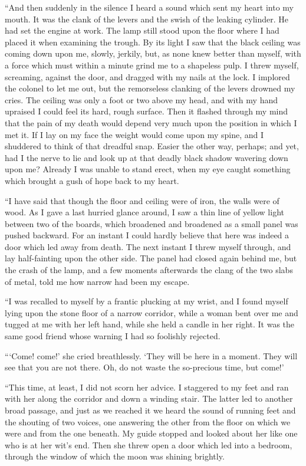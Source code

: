 \documentclass{article}
\begin{document}
``And then suddenly in the silence I heard a sound which sent my heart
into my mouth. It was the clank of the levers and the swish of the leaking
cylinder. He had set the engine at work. The lamp still stood upon the
floor where I had placed it when examining the trough. By its light I
saw that the black ceiling was coming down upon me, slowly, jerkily, but,
as none knew better than myself, with a force which must within a minute
grind me to a shapeless pulp. I threw myself, screaming, against the door,
and dragged with my nails at the lock. I implored the colonel to let me
out, but the remorseless clanking of the levers drowned my cries. The
ceiling was only a foot or two above my head, and with my hand upraised
I could feel its hard, rough surface. Then it flashed through my mind
that the pain of my death would depend very much upon the position in
which I met it. If I lay on my face the weight would come upon my spine,
and I shuddered to think of that dreadful snap. Easier the other way,
perhaps; and yet, had I the nerve to lie and look up at that deadly black
shadow wavering down upon me? Already I was unable to stand erect, when
my eye caught something which brought a gush of hope back to my heart.

``I have said that though the floor and ceiling were of iron, the walls
were of wood. As I gave a last hurried glance around, I saw a thin line
of yellow light between two of the boards, which broadened and broadened
as a small panel was pushed backward. For an instant I could hardly
believe that here was indeed a door which led away from death. The next
instant I threw myself through, and lay half-fainting upon the other
side. The panel had closed again behind me, but the crash of the lamp,
and a few moments afterwards the clang of the two slabs of metal, told
me how narrow had been my escape.

``I was recalled to myself by a frantic plucking at my wrist, and I
found myself lying upon the stone floor of a narrow corridor, while a
woman bent over me and tugged at me with her left hand, while she held
a candle in her right. It was the same good friend whose warning I had
so foolishly rejected.

```Come! come!' she cried breathlessly. `They will be here in a
moment. They will see that you are not there. Oh, do not waste the
so-precious time, but come!'

``This time, at least, I did not scorn her advice. I staggered to my
feet and ran with her along the corridor and down a winding stair. The
latter led to another broad passage, and just as we reached it we heard
the sound of running feet and the shouting of two voices, one answering
the other from the floor on which we were and from the one beneath. My
guide stopped and looked about her like one who is at her wit's end. Then
she threw open a door which led into a bedroom, through the window of
which the moon was shining brightly.
\end{document}
